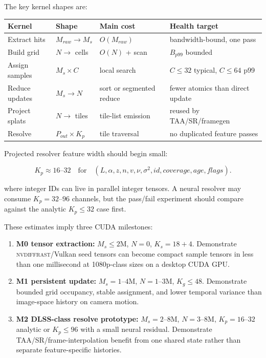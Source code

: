 \documentclass[11pt]{article}
\begin{document}
The key kernel shapes are:

\begin{center}
\begin{tabular}{llll}
\toprule
Kernel & Shape & Main cost & Health target \\
\midrule
Extract hits & $M_{raw}\rightarrow M_s$ & $O(M_{raw})$ & bandwidth-bound, one pass \\
Build grid & $N\rightarrow$ cells & $O(N)$ + scan & $B_{p99}$ bounded \\
Assign samples & $M_s\times C$ & local search & $C\le 32$ typical, $C\le 64$ p99 \\
Reduce updates & $M_s\rightarrow N$ & sort or segmented reduce & fewer atomics than direct update \\
Project splats & $N\rightarrow$ tiles & tile-list emission & reused by TAA/SR/framegen \\
Resolve & $P_{out}\times K_p$ & tile traversal & no duplicated feature passes \\
\bottomrule
\end{tabular}
\end{center}

Projected resolver feature width should begin small:

\[
  K_p \approx 16\text{--}32
  \quad\text{for}\quad
  (L,\alpha,z,n,v,\nu,\sigma^2,id,coverage,age,flags).
\]

where integer IDs can live in parallel integer tensors. A neural resolver may
consume $K_p=32$--$96$ channels, but the pass/fail experiment should compare
against the analytic $K_p\le 32$ case first.

These estimates imply three CUDA milestones:

\begin{enumerate}
  \item \textbf{M0 tensor extraction:} $M_s\le 2$M, $N=0$, $K_s=18+4$.
        Demonstrate \textsc{nvdiffrast}/Vulkan seed tensors can become compact
        sample tensors in less than one millisecond at 1080p-class sizes on a
        desktop CUDA GPU.
  \item \textbf{M1 persistent update:} $M_s=1$--$4$M, $N=1$--$3$M,
        $K_g\le 48$. Demonstrate bounded grid occupancy, stable assignment,
        and lower temporal variance than image-space history on camera motion.
  \item \textbf{M2 DLSS-class resolve prototype:} $M_s=2$--$8$M,
        $N=3$--$8$M, $K_p=16$--$32$ analytic or $K_p\le 96$ with a small
        neural residual. Demonstrate TAA/SR/frame-interpolation benefit from
        one shared state rather than separate feature-specific histories.
\end{enumerate}
\end{document}
